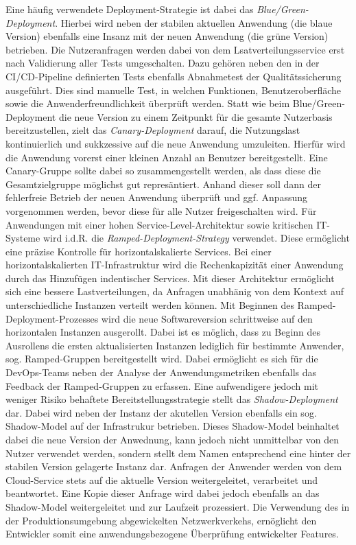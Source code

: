 Eine häufig verwendete Deployment-Strategie ist dabei das \textit{Blue/Green-Deployment}. Hierbei wird neben der stabilen aktuellen Anwendung (die blaue Version) ebenfalls eine Insanz mit der neuen Anwendung (die grüne Version) betrieben. Die Nutzeranfragen werden dabei von dem Lsatverteilungsservice erst nach Validierung aller Tests umgeschalten. Dazu gehören neben den in der CI/CD-Pipeline definierten Tests ebenfalls Abnahmetest der Qualitätssicherung ausgeführt. Dies sind manuelle Test, in welchen Funktionen, Benutzeroberfläche sowie die Anwenderfreundlichkeit überprüft werden. Statt wie beim Blue/Green-Deployment die neue Version zu einem Zeitpunkt für die gesamte Nutzerbasis bereitzustellen, zielt das \textit{Canary-Deployment} darauf, die Nutzungslast kontinuierlich und sukkzessive auf die neue Anwendung umzuleiten. Hierfür wird die Anwendung vorerst einer kleinen Anzahl an Benutzer bereitgestellt. Eine Canary-Gruppe sollte dabei so zusammengestellt werden, als dass diese die Gesamtzielgruppe möglichst gut represäntiert. Anhand dieser soll dann der fehlerfreie Betrieb der neuen Anwendung überprüft und ggf. Anpassung vorgenommen werden, bevor diese für alle Nutzer freigeschalten wird. Für Anwendungen mit einer hohen Service-Level-Architektur sowie kritischen IT-Systeme wird i.d.R. die \textit{Ramped-Deployment-Strategy} verwendet. Diese ermöglicht eine präzise Kontrolle für horizontalskalierte Services. Bei einer horizontalskalierten IT-Infrastruktur wird die Rechenkapizität einer Anwendung durch das Hinzufügen indentischer Services. Mit dieser Architektur ermöglicht sich eine bessere Lastverteilungen, da Anfragen unabhänig von dem Kontext auf unterschiedliche  Instanzen verteilt werden können. Mit Beginnen des Ramped-Deployment-Prozesses wird die neue Softwareversion schrittweise auf den horizontalen Instanzen ausgerollt. Dabei ist es möglich, dass zu Beginn des Ausrollens die ersten aktualisierten Instanzen lediglich für bestimmte Anwender, sog. Ramped-Gruppen bereitgestellt wird. Dabei ermöglicht es sich für die DevOps-Teams neben der Analyse der Anwendungsmetriken ebenfalls das Feedback der Ramped-Gruppen zu erfassen. Eine aufwendigere jedoch mit weniger Risiko behaftete Bereitstellungsstrategie stellt das \textit{Shadow-Deployment} dar. Dabei wird neben der Instanz der akutellen Version ebenfalls ein sog. Shadow-Model auf der Infrastrukur betrieben. Dieses Shadow-Model beinhaltet dabei die neue Version der Anwednung, kann jedoch nicht unmittelbar von den Nutzer verwendet werden, sondern stellt dem Namen entsprechend eine hinter der stabilen Version gelagerte Instanz dar. Anfragen der Anwender werden von dem Cloud-Service stets auf die aktuelle Version weitergeleitet, verarbeitet und beantwortet. Eine Kopie dieser Anfrage wird dabei jedoch ebenfalls an das Shadow-Model weitergeleitet und zur Laufzeit prozessiert. Die Verwendung des in der Produktionsumgebung abgewickelten Netzwerkverkehs, ernöglicht den Entwickler somit eine anwendungsbezogene Überprüfung entwickelter Features. 
